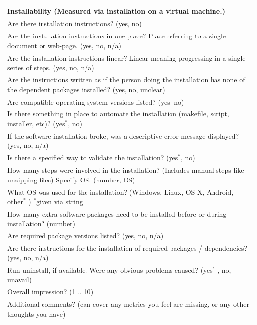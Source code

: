 \documentclass[letterpaper,cleveref]{lipics-v2019}
\begin{document}
\def\arraystretch{1.5}
\begin{tabular}{p{14cm}}
	\hline		
	\textbf{Installability (Measured via installation on a virtual machine.) }\\
	\hline
	Are there installation instructions? ({yes, no})\\
	Are the installation instructions in one place? Place referring to a single
	document or web-page. ({yes, no, n/a})\\
	Are the installation instructions linear? Linear meaning progressing  in a
	single series of steps. ({yes, no, n/a})\\
	Are the instructions written as if the person doing the installation has none
	of the dependent packages installed? ({yes, no, unclear})\\
	Are compatible operating system versions listed? ({yes, no})\\
	Is there something in place to automate the installation (makefile, script,
	installer, etc)? ({yes$^*$, no})\\
	If the software installation broke, was a descriptive error message displayed?
	({yes, no, n/a})\\
	Is there a specified way to validate the installation? ({yes$^*$, no})\\
	How many steps were involved in the installation? (Includes manual steps like
	unzipping files) Specify OS. (number, OS)\\
	What OS was used for the installation? ({Windows, Linux, OS X, Android, other$^*$
	}) $^*$given via string\\
	How many extra software packages need to be installed before or during
	installation? (number)\\
	Are required package versions listed? ({yes, no, n/a})\\
	Are there instructions for the installation of required packages /
	dependencies? ({yes, no, n/a})\\
	Run uninstall, if available. Were any obvious problems caused? ({yes$^*$ , no,
	unavail})\\
	Overall impression? ({1 .. 10})\\
	Additional comments? (can cover any metrics you feel are missing, or any other
	thoughts you have)\\
	\hline
\end{tabular}
\end{document}
